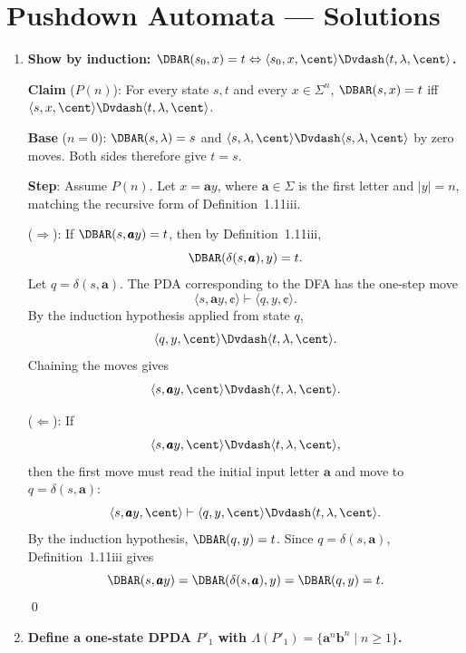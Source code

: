 
\chapter{Pushdown Automata --- Solutions}

\begin{enumerate}[{10.}1. ]

\item \textbf{Show by induction: $\DBAR(s_0,x)=t \Leftrightarrow \langle s_0,x,\cent\rangle\Dvdash\langle t,\lambda,\cent\rangle$.}

\textbf{Claim} ($P(n)$): For every state $s,t$ and every $x \in \Sigma^n$,
$\DBAR(s,x)=t$ iff
$\langle s,x,\cent\rangle\Dvdash\langle t,\lambda,\cent\rangle$.

\textbf{Base} ($n=0$): $\DBAR(s,\lambda)=s$ and
$\langle s,\lambda,\cent\rangle\Dvdash\langle s,\lambda,\cent\rangle$ by zero
moves. Both sides therefore give $t=s$. \checkmark

\textbf{Step}: Assume $P(n)$. Let $x=\pmb{a}y$, where $\pmb{a}\in\Sigma$ is
the first letter and $|y|=n$, matching the recursive form of
Definition~1.11iii.

($\Rightarrow$): If $\DBAR(s,\pmb{a}y)=t$, then by Definition~1.11iii,
\[
\DBAR(\delta(s,\pmb{a}),y)=t.
\]
Let $q=\delta(s,\pmb{a})$. The PDA corresponding to the DFA has the one-step
move
\[
\langle s,\pmb{a}y,\cent\rangle\vdash\langle q,y,\cent\rangle.
\]
By the induction hypothesis applied from state $q$,
\[
\langle q,y,\cent\rangle\Dvdash\langle t,\lambda,\cent\rangle.
\]
Chaining the moves gives
\[
\langle s,\pmb{a}y,\cent\rangle\Dvdash
\langle t,\lambda,\cent\rangle.
\]

($\Leftarrow$): If
\[
\langle s,\pmb{a}y,\cent\rangle\Dvdash\langle t,\lambda,\cent\rangle,
\]
then the first move must read the initial input letter $\pmb{a}$ and move to
$q=\delta(s,\pmb{a})$:
\[
\langle s,\pmb{a}y,\cent\rangle\vdash\langle q,y,\cent\rangle
\Dvdash\langle t,\lambda,\cent\rangle.
\]
By the induction hypothesis, $\DBAR(q,y)=t$. Since $q=\delta(s,\pmb{a})$,
Definition~1.11iii gives
\[
\DBAR(s,\pmb{a}y)=\DBAR(\delta(s,\pmb{a}),y)=\DBAR(q,y)=t.
\]
\qed

\item \textbf{Define a one-state DPDA $P'_1$ with $\Lambda(P'_1)=\{\pmb{a}^n\pmb{b}^n \mid n\geq 1\}$.}


\end{enumerate}
